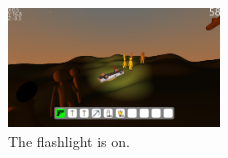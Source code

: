 \begin{mdframed}[backgroundcolor=gray!20]
  \begin{figure}[H]
    \centering
    \includegraphics[width=0.5\textwidth]{chapters/tests/resources/flashlight.png}
    \caption{The flashlight is on.}
    \label{fig:flashlight_on}
  \end{figure}
\end{mdframed}

